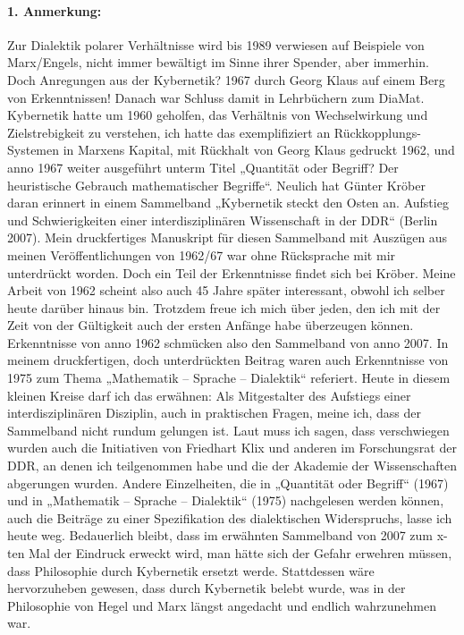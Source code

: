 \documentclass[11pt,a4paper]{article}
\begin{document}
\paragraph{1. Anmerkung:}
Zur Dialektik polarer Verhältnisse wird bis 1989 verwiesen auf Beispiele von
Marx/Engels, nicht immer bewältigt im Sinne ihrer Spender, aber immerhin. Doch
Anregungen aus der Kybernetik? 1967 durch Georg Klaus auf einem Berg von
Erkenntnissen! Danach war Schluss damit in Lehrbüchern zum DiaMat. Kybernetik
hatte um 1960 geholfen, das Verhältnis von Wechselwirkung und Zielstrebigkeit
zu verstehen, ich hatte das exemplifiziert an Rückkopplungs-Systemen in
Marxens Kapital, mit Rückhalt von Georg Klaus gedruckt 1962, und anno 1967
weiter ausgeführt unterm Titel „Quantität oder Begriff? Der heuristische
Gebrauch mathematischer Begriffe“. Neulich hat Günter Kröber daran erinnert in
einem Sammelband „Kybernetik steckt den Osten an. Aufstieg und Schwierigkeiten
einer interdisziplinären Wissenschaft in der DDR“ (Berlin 2007). Mein
druckfertiges Manuskript für diesen Sammelband mit Auszügen aus meinen
Veröffentlichungen von 1962/67 war ohne Rücksprache mit mir unterdrückt
worden.  Doch ein Teil der Erkenntnisse findet sich bei Kröber. Meine Arbeit
von 1962 scheint also auch 45 Jahre später interessant, obwohl ich selber
heute darüber hinaus bin. Trotzdem freue ich mich über jeden, den ich mit der
Zeit von der Gültigkeit auch der ersten Anfänge habe überzeugen können.
Erkenntnisse von anno 1962 schmücken also den Sammelband von anno 2007. In
meinem druckfertigen, doch unterdrückten Beitrag waren auch Erkenntnisse von
1975 zum Thema „Mathematik – Sprache – Dialektik“ referiert. Heute in diesem
kleinen Kreise darf ich das erwähnen: Als Mitgestalter des Aufstiegs einer
interdisziplinären Disziplin, auch in praktischen Fragen, meine ich, dass der
Sammelband nicht rundum gelungen ist. Laut muss ich sagen, dass verschwiegen
wurden auch die Initiativen von Friedhart Klix und anderen im Forschungsrat
der DDR, an denen ich teilgenommen habe und die der Akademie der
Wissenschaften abgerungen wurden. Andere Einzelheiten, die in „Quantität oder
Begriff“ (1967) und in „Mathematik – Sprache – Dialektik“ (1975) nachgelesen
werden können, auch die Beiträge zu einer Spezifikation des dialektischen
Widerspruchs, lasse ich heute weg. Bedauerlich bleibt, dass im erwähnten
Sammelband von 2007 zum x-ten Mal der Eindruck erweckt wird, man hätte sich
der Gefahr erwehren müssen, dass Philosophie durch Kybernetik ersetzt werde.
Stattdessen wäre hervorzuheben gewesen, dass durch Kybernetik belebt wurde,
was in der Philosophie von Hegel und Marx längst angedacht und endlich
wahrzunehmen war.
\end{document}
